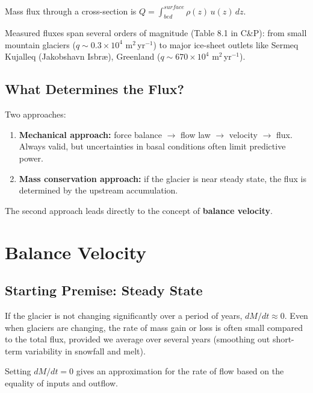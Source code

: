 \documentclass[11pt]{article}
\begin{document}
Mass flux through a cross-section is $Q = \int_{bed}^{surface} \rho(z)\, u(z) \, dz$.

Measured fluxes span several orders of magnitude (Table 8.1 in C\&P): from small mountain glaciers ($q \sim 0.3 \times 10^4$ m$^2$\,yr$^{-1}$) to major ice-sheet outlets like Sermeq Kujalleq (Jakobshavn Isbr\ae), Greenland ($q \sim 670 \times 10^4$ m$^2$\,yr$^{-1}$).

\subsection{What Determines the Flux?}

Two approaches:
\begin{enumerate}
  \item \textbf{Mechanical approach:} force balance $\to$ flow law $\to$ velocity $\to$ flux.  Always valid, but uncertainties in basal conditions often limit predictive power.
  \item \textbf{Mass conservation approach:} if the glacier is near steady state, the flux is determined by the upstream accumulation.
\end{enumerate}

The second approach leads directly to the concept of \textbf{balance velocity}.

\section{Balance Velocity}

\subsection{Starting Premise: Steady State}

If the glacier is not changing significantly over a period of years, $dM/dt \approx 0$.  Even when glaciers are changing, the rate of mass gain or loss is often small compared to the total flux, provided we average over several years (smoothing out short-term variability in snowfall and melt).

Setting $dM/dt = 0$ gives an approximation for the rate of flow based on the equality of inputs and outflow.

\end{document}
